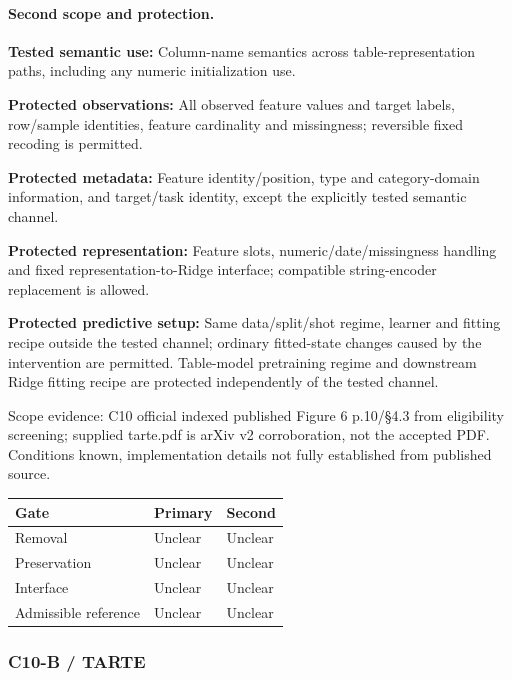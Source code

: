 \documentclass[10pt]{article}
\begin{document}
\paragraph{Second scope and protection.}
\textbf{Tested semantic use:} Column-name semantics across table-representation paths, including any numeric initialization use.\par
\textbf{Protected observations:} All observed feature values and target labels, row/sample identities, feature cardinality and missingness; reversible fixed recoding is permitted.\par
\textbf{Protected metadata:} Feature identity/position, type and category-domain information, and target/task identity, except the explicitly tested semantic channel.\par
\textbf{Protected representation:} Feature slots, numeric/date/missingness handling and fixed representation-to-Ridge interface; compatible string-encoder replacement is allowed.\par
\textbf{Protected predictive setup:} Same data/split/shot regime, learner and fitting recipe outside the tested channel; ordinary fitted-state changes caused by the intervention are permitted. Table-model pretraining regime and downstream Ridge fitting recipe are protected independently of the tested channel.\par
Scope evidence: C10 official indexed published Figure 6 p.10/§4.3 from eligibility screening; supplied tarte.pdf is arXiv v2 corroboration, not the accepted PDF. Conditions known, implementation details not fully established from published source.\par
\begin{tabular}{lll}\toprule Gate & Primary & Second \\ \midrule
Removal & Unclear & Unclear \\
Preservation & Unclear & Unclear \\
Interface & Unclear & Unclear \\
Admissible reference & Unclear & Unclear \\
\bottomrule\end{tabular}
\subsubsection*{C10-B / TARTE}
\end{document}
